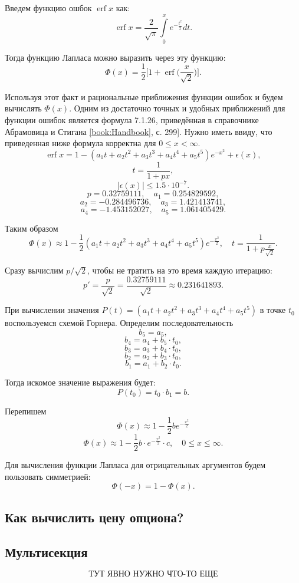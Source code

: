 \documentclass{article}
\begin{document}
Введем функцию ошбок $\operatorname{erf} x$ как:
\[
\operatorname{erf} x = \frac{2}{\sqrt{\pi}}\int\limits_{0}^{x}e^{-\frac{t^2}{2}}dt.
\]

Тогда функцию Лапласа можно выразить через эту функцию:
\[
\Phi(x) = \frac{1}{2}\Bigg[ 1 + \operatorname{erf}\bigg(\frac{x}{\sqrt{2}}\bigg) \Bigg].
\]

Используя этот факт и рациональные приближения функции ошибок и будем вычислять $\Phi(x)$. Одним из достаточно точных и удобных приближений для функции ошибок является формула 7.1.26, приведённая в справочнике Абрамовица и Стигана \lbrack\ref{book:Handbook}, с. 299\rbrack]. Нужно иметь ввиду, что приведенная ниже формула корректна для $0 \leq x < \infty$.
\[
\operatorname{erf}x = 1 - (a_1t + a_2t^2 + a_3t^3 + a_4t^4 + a_5t^5)e^{-x^2} + \epsilon(x),
\]
\[
t = \frac{1}{1 + px},
\]
\[
|\epsilon(x)| \leq 1.5\cdot 10^{-7}.
\]
\[
p = 0.32759111, \quad a_1 = 0.254829592,
\]
\[
a_2 = -0.284496736, \quad a_3 = 1.421413741,
\]
\[
a_4 = -1.453152027, \quad a_5 = 1.061405429.
\]

Таким образом
\[
\Phi(x) \approx 1 - \frac{1}{2}(a_1t + a_2t^2 + a_3t^3 + a_4t^4 + a_5t^5)e^{-\frac{x^2}{2}}, \quad t = \frac{1}{1 + p\frac{x}{\sqrt{2}}}.
\]

Сразу вычислим $p / \sqrt{2}$, чтобы не тратить на это время каждую итерацию:
\[
p' = \frac{p}{\sqrt{2}} = \frac{ 0.32759111}{\sqrt{2}} \approx 0.231641893.
\]

При вычислении значения $P(t) = (a_1t + a_2t^2 + a_3t^3 + a_4t^4 + a_5t^5)$ в точке $t_0$ воспользуемся схемой Горнера. Определим последовательность
\[
b_5 = a_5,
\]
\[
b_4 = a_4 + b_5 \cdot t_0,
\]
\[
b_3 = a_3 + b_4\cdot t_0,
\]
\[
b_2 = a_2 + b_3\cdot t_0,
\]
\[
b_1 = a_1 + b_2 \cdot t_0.
\]

Тогда искомое значение выражения будет:
\[
P(t_0) = t_0 \cdot b_1 = b.
\]

Перепишем
\[
\Phi(x) \approx 1 - \frac{1}{2}be^{-\frac{x^2}{2}}
\]
\[
\Phi(x) \approx 1 - \frac{1}{2}b\cdot e^{-\frac{x^2}{2}} \cdot c, \quad 0 \leq x \leq \infty.
\]

Для вычисления функции Лапласа для отрицательных аргументов будем пользовать симметрией:
\[
\Phi(-x) = 1 - \Phi(x). 
\]
\subsection{Как вычислить цену опциона?}


\subsection{Мультисекция}
\[
\textbf{ТУТ ЯВНО НУЖНО ЧТО-ТО  ЕЩЕ}
\]
\end{document}
